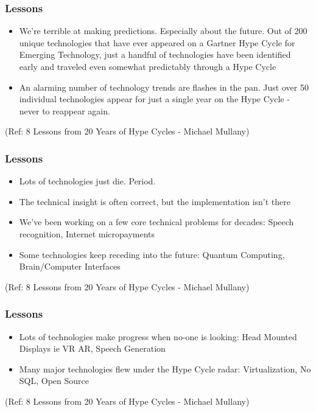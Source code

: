 \begin{frame}[fragile]\frametitle{Lessons}


\begin{itemize}
\item  We're terrible at making predictions. Especially about the future. Out of 200 unique technologies that have ever appeared on a Gartner Hype Cycle for Emerging Technology, just a handful of technologies  have been identified early and traveled even somewhat predictably through a Hype Cycle
\item An alarming number of technology trends are flashes in the pan. Just over 50 individual technologies appear for just a single year on the Hype Cycle - never to reappear again. 
\end{itemize}


{\tiny (Ref: 8 Lessons from 20 Years of Hype Cycles - Michael Mullany)}

\end{frame}

\begin{frame}[fragile]\frametitle{Lessons}


\begin{itemize}
\item  Lots of technologies just die. Period. 
\item The technical insight is often correct, but the implementation isn't there
\item We've been working on a few core technical problems for decades: Speech recognition, Internet micropayments
\item Some technologies keep receding into the future: Quantum Computing, Brain/Computer Interfaces
\end{itemize}


{\tiny (Ref: 8 Lessons from 20 Years of Hype Cycles - Michael Mullany)}

\end{frame}

\begin{frame}[fragile]\frametitle{Lessons}


\begin{itemize}
\item Lots of technologies make progress when no-one is looking: Head Mounted Displays ie VR AR, Speech Generation
\item  Many major technologies flew under the Hype Cycle radar: Virtualization, No SQL, Open Source
\end{itemize}


{\tiny (Ref: 8 Lessons from 20 Years of Hype Cycles - Michael Mullany)}

\end{frame}


